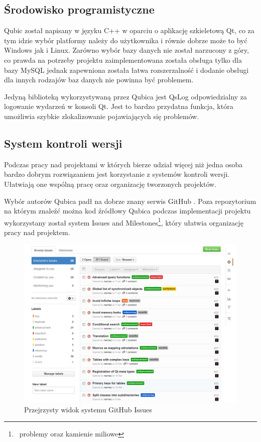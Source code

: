 \documentclass[12pt]{report}
\begin{document}
\subsection{Środowisko programistyczne}

Qubic został napisany w języku C++ w oparciu o aplikację szkieletową Qt, co za tym idzie wybór platformy należy do użytkownika i równie dobrze może to być Windows jak i Linux.
Zarówno wybór bazy danych nie został narzucony z góry, co prawda na potrzeby projektu zaimplementowana została obsługa tylko dla bazy MySQL jednak zapewniona została 
łatwa rozszerzalność i dodanie obsługi dla innych rodzajów baz danych nie powinna być problemem.

Jedyną biblioteką wykorzystywaną przez Qubica jest QsLog \cite{qslog} odpowiedzialny za logowanie wydarzeń w konsoli Qt. Jest to bardzo przydatna funkcja, która umożliwia
szybkie zlokalizowanie pojawiających się problemów.

\subsection{System kontroli wersji}

Podczas pracy nad projektami w których bierze udział więcej niż jedna osoba bardzo dobrym rozwiązaniem jest korzystanie z systemów kontroli wersji. Ułatwiają one wspólną
pracę oraz organizację tworzonych projektów.

Wybór autorów Qubica padł na dobrze znany serwis GitHub \cite{github}. Poza repozytorium na którym znaleźć można kod źródłowy Qubica podczas implementacji projektu
wykorzystany został system Issues and Milestones\footnote{~problemy oraz kamienie miliowe}, który ułatwia organizację pracy nad projektem.

\begin{figure}[h]
\centering
\includegraphics[width=\textwidth]{resources/githubissue.png}
\caption{Przejrzysty widok systemu GitHub Issues}
\end{figure}
\end{document}
